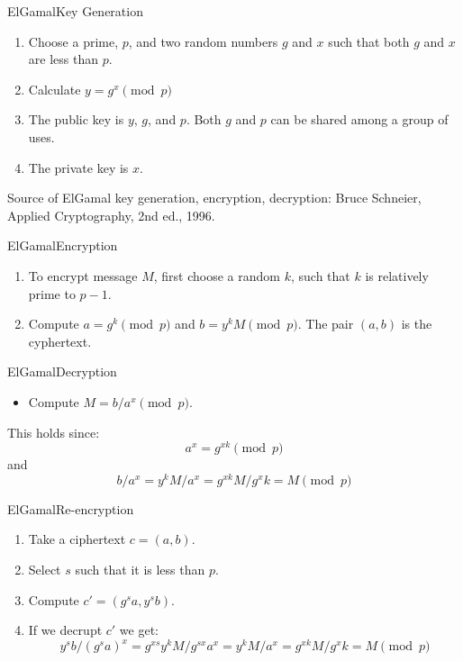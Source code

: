\documentclass[utf8]{beamer}
\begin{document}
\begin{frame}{ElGamal}{Key Generation}

  \begin{enumerate}
    \item Choose a prime, $p$, and two random numbers $g$ and $x$ such
      that both $g$ and $x$ are less than $p$.
    \item Calculate $y = g^x\pmod{p}$
    \item The public key is $y$, $g$, and $p$. Both $g$ and $p$ can be
      shared among a group of uses. 
    \item The private key is $x$.

  \end{enumerate}

Source of ElGamal key generation, encryption, decryption: Bruce
Schneier, Applied Cryptography, 2nd ed., 1996.

\end{frame}

\begin{frame}{ElGamal}{Encryption}

  \begin{enumerate}
    \item To encrypt message $M$, first choose a random $k$, such that
      $k$ is relatively prime to $p - 1$.
    \item Compute $a = g^k\pmod{p}$ and $b = y^kM\pmod{p}$. The pair
      $(a, b)$ is the cyphertext.
    \end{enumerate}
  \end{frame}

\begin{frame}{ElGamal}{Decryption}

  \begin{itemize}
  \item Compute $M = b / a^x\pmod{p}$.
  \end{itemize}
  
  This holds since:
  \[ a^x = g^{xk}\pmod{p} \]
  and 
  \[ b/a^x = y^kM/a^x = g^{xk}M/g^xk = M\pmod{p} \]

\end{frame}

\begin{frame}{ElGamal}{Re-encryption}

  \begin{enumerate}
  \item Take a ciphertext $c = (a, b)$.
  \item Select $s$ such that it is less than $p$.
  \item Compute $c' = (g^sa, y^sb)$.
  \item If we decrupt $c'$ we get:
    \[y^sb / (g^sa)^x = g^{xs}y^kM / g^{sx}a^x = y^kM / a^x = g^{xk}M/g^xk =
    M\pmod{p} \]
  \end{enumerate}
    
\end{frame}
\end{document}
